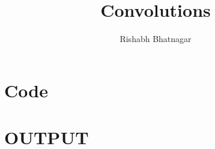 \documentclass[a4paper]{article}
\begin{document}
\title{Convolutions}
\author{Rishabh Bhatnagar}
\maketitle

\section*{Code}


\section*{OUTPUT}

\end{document}
